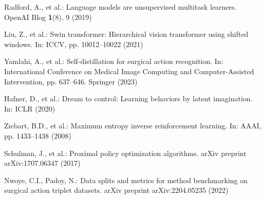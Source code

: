 \documentclass[runningheads]{llncs}
\begin{document}
\begin{thebibliography}{22}
Radford, A., et al.: Language models are unsupervised multitask learners. OpenAI Blog \textbf{1}(8), 9 (2019)

Liu, Z., et al.: Swin transformer: Hierarchical vision transformer using shifted windows. In: ICCV, pp. 10012--10022 (2021)

Yamlahi, A., et al.: Self-distillation for surgical action recognition. In: International Conference on Medical Image Computing and Computer-Assisted Intervention, pp. 637--646. Springer (2023)

Hafner, D., et al.: Dream to control: Learning behaviors by latent imagination. In: ICLR (2020)

Ziebart, B.D., et al.: Maximum entropy inverse reinforcement learning. In: AAAI, pp. 1433--1438 (2008)

Schulman, J., et al.: Proximal policy optimization algorithms. arXiv preprint arXiv:1707.06347 (2017)

Nwoye, C.I., Padoy, N.: Data splits and metrics for method benchmarking on surgical action triplet datasets. arXiv preprint arXiv:2204.05235 (2022)
\end{thebibliography}
\end{document}
